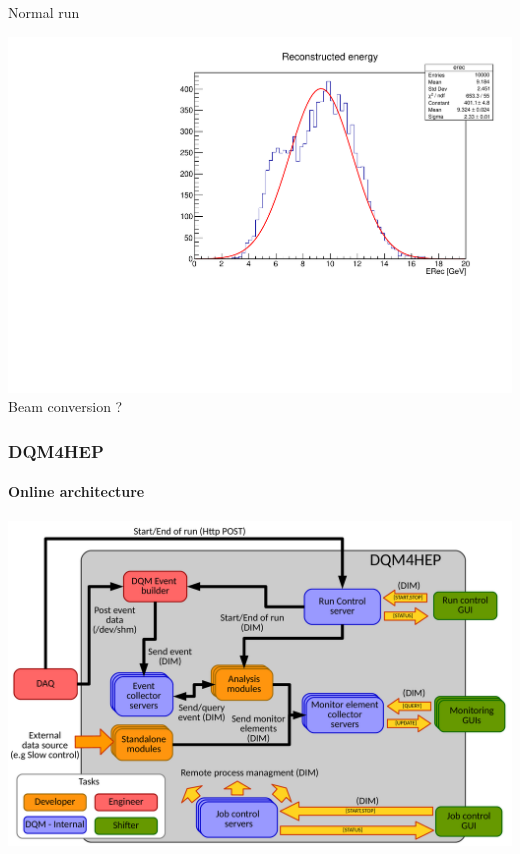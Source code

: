 \documentclass[presentation, 10pt]{beamer}
\begin{document}
\begin{frame}
\begin{minipage}{0.3\linewidth}
    Normal run
  \end{minipage}
  \begin{minipage}{0.3\linewidth}
    \centering
    \includegraphics[width=\linewidth]{figs/ERecExampleUnexpected.pdf} \\
    Beam conversion ?
  \end{minipage}
\end{frame}

\begin{frame}
  \frametitle{DQM4HEP}
  \framesubtitle{Online architecture}
  \centering\includegraphics[width=0.9\linewidth]{figs/GlobalArchitectureDiagram.pdf}
\end{frame}
\end{document}
